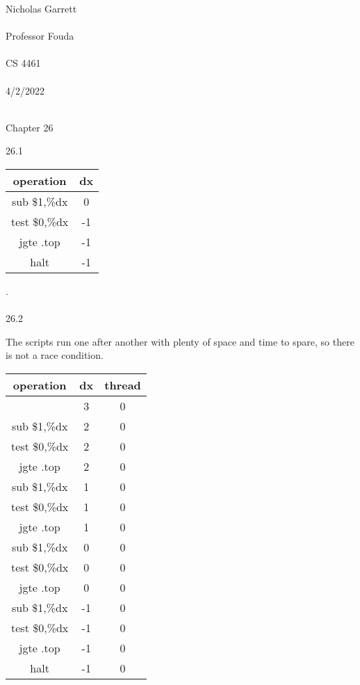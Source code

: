 \documentclass[12pt, a4paper]{article}
\begin{document}
\noindent
Nicholas Garrett\\ \\
Professor Fouda\\ \\
CS 4461\\ \\
4/2/2022\\ \\


\begin{center}
\end{center}

\noindent
Chapter 26

26.1

	\begin{center}
	\begin{tabular}{||c c ||} 
	 \hline
	  operation &  dx \\ [0.5ex] 
	 \hline\hline
	 sub \$1,\%dx  & 0 \\ 
	 \hline
	 test \$0,\%dx & -1 \\
	 \hline
	 jgte .top & -1 \\
	 \hline
	 halt & -1 \\
	 \hline
	\end{tabular}
	\end{center}
	.\\ \\

26.2

	The scripts run one after another with plenty of space and time to spare, so there is not a race condition.
	\begin{center}
	\begin{tabular}{||c c c ||} 
	 \hline
	  operation &  dx & thread \\ [0.5ex] 
	 \hline\hline
	 
	  & 3 &0\\ 
	 \hline
	 sub \$1,\%dx  & 2 &0\\ 
	 \hline
	 test \$0,\%dx & 2 &0\\
	 \hline
	 jgte .top & 2 &0\\
	 \hline
	  sub \$1,\%dx  & 1 &0\\ 
	 \hline
	 test \$0,\%dx & 1 &0\\
	 \hline
	 jgte .top & 1 &0\\
	 \hline
	  sub \$1,\%dx  & 0 &0\\ 
	 \hline
	 test \$0,\%dx & 0 &0\\
	 \hline
	 jgte .top & 0 &0\\
	 \hline
	  sub \$1,\%dx  & -1 &0\\ 
	 \hline
	 test \$0,\%dx & -1 &0\\
	 \hline
	 jgte .top & -1 &0\\
	 \hline
	 halt & -1 &0\\
	 \hline
	  \hline
	\end{tabular}
	\end{center}
	
\end{document}
